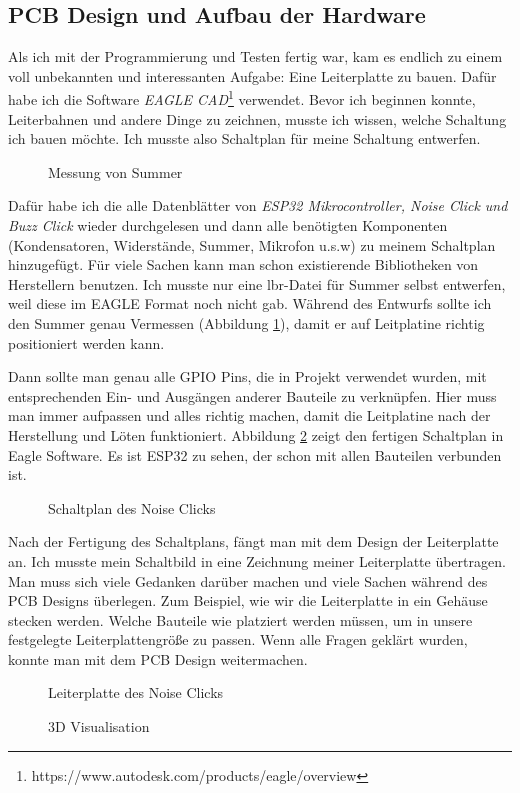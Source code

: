 \subsection{PCB Design und Aufbau der Hardware}
\label{sec:main:pcb}
Als ich mit der Programmierung und Testen fertig war, kam es endlich zu einem voll unbekannten und interessanten Aufgabe: Eine Leiterplatte zu bauen. Dafür habe ich die Software \textit{EAGLE CAD}\footnote{https://www.autodesk.com/products/eagle/overview} verwendet. Bevor ich beginnen konnte, Leiterbahnen und andere Dinge zu zeichnen, musste ich wissen, welche Schaltung ich bauen möchte. Ich musste also Schaltplan für meine Schaltung entwerfen.

\begin{figure}[ht]
	\centering
	\caption{Messung von Summer}
	\label{fig:buzzer}
\end{figure}

Dafür habe ich die alle Datenblätter von \textit{ESP32 Mikrocontroller, Noise Click und Buzz Click } wieder durchgelesen und dann alle benötigten Komponenten (Kondensatoren, Widerstände, Summer, Mikrofon u.s.w) zu meinem Schaltplan hinzugefügt. Für viele Sachen kann man schon existierende Bibliotheken von Herstellern benutzen. Ich musste nur eine lbr-Datei für Summer selbst entwerfen, weil diese im EAGLE Format noch nicht gab. Während des Entwurfs sollte ich den Summer genau Vermessen (Abbildung \ref{fig:buzzer}), damit er auf Leitplatine richtig positioniert werden kann. 

Dann sollte man genau alle GPIO Pins, die in Projekt verwendet wurden, mit entsprechenden Ein- und Ausgängen anderer Bauteile zu verknüpfen. Hier muss man immer aufpassen und alles richtig machen, damit die Leitplatine nach der Herstellung und Löten funktioniert. Abbildung \ref{fig:schematic} zeigt den fertigen Schaltplan in Eagle Software. Es ist ESP32 zu sehen, der schon mit allen Bauteilen verbunden ist.
\begin{figure}[ht]
	\centering
	\caption{Schaltplan des Noise Clicks}
	\label{fig:schematic}
\end{figure}

Nach der Fertigung des Schaltplans, fängt man mit dem Design der Leiterplatte an. Ich musste mein Schaltbild in eine Zeichnung meiner Leiterplatte übertragen. Man muss sich viele Gedanken darüber machen und viele Sachen während des PCB Designs überlegen. Zum Beispiel, wie wir die Leiterplatte in ein Gehäuse stecken werden. Welche Bauteile wie platziert werden müssen, um in unsere festgelegte Leiterplattengröße zu passen. Wenn alle Fragen geklärt wurden, konnte man mit dem PCB Design weitermachen. 
\begin{figure}[ht]
	\centering
	\caption{Leiterplatte des Noise Clicks}
	\label{fig:platestart}
\end{figure}
\begin{figure}[ht]
	\centering
	\caption{3D Visualisation}
	\label{fig:platedone}
\end{figure}

